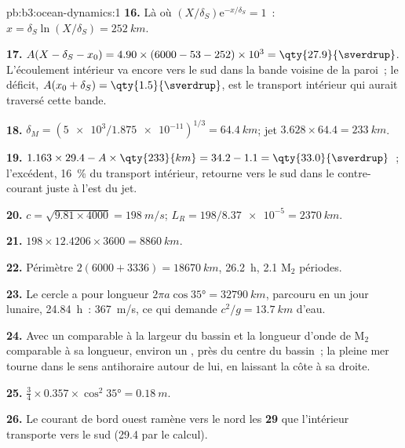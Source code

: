 \begin{solution}{pb:b3:ocean-dynamics:1}
\textbf{16.} Là où $(X/\delta_S)\mathrm e^{-x/\delta_S} = 1$~: $x =
\delta_S\ln(X/\delta_S) = \qty{252}{km}$.

\textbf{17.} $A(X - \delta_S - x_0) = 4.90\times(6000 - 53 - 252)\times
10^3 = \qty{27.9}{\sverdrup}$. L'écoulement intérieur va encore vers le sud dans
la bande voisine de la paroi~; le déficit, $A(x_0 + \delta_S) =
\qty{1.5}{\sverdrup}$, est le transport intérieur qui aurait traversé
cette bande.

\textbf{18.} $\delta_M = (\num{5e3}/\num{1.875e-11})^{1/3} = \qty{64.4}{km}$;
jet $3.628\times64.4 = \qty{233}{km}$.

\textbf{19.} $1.163\times29.4 - A\times\qty{233}{km} = 34.2 - 1.1 =
\qty{33.0}{\sverdrup}$~; l'excédent, \qty{16}{\percent} du transport
intérieur, retourne vers le sud dans le contre-courant juste à l'est du jet.

\textbf{20.} $c = \sqrt{9.81\times4000} = \qty{198}{m/s}$; $L_R =
198/\num{8.37e-5} = \qty{2370}{km}$.

\textbf{21.} $198\times12.4206\times3600 = \qty{8860}{km}$.

\textbf{22.} Périmètre $2(6000 + 3336) = \qty{18670}{km}$, \qty{26.2}{h},
2.1 M$_2$ périodes.

\textbf{23.} Le cercle a pour longueur $2\pi a\cos\ang{35} = \qty{32790}{km}$, parcouru
en un jour lunaire, \qty{24.84}{h}~: \qty{367}{m/s}, ce qui demande $c^2/g =
\qty{13.7}{km}$ d'eau.

\textbf{24.} Avec un  comparable à la largeur du bassin
et la longueur d'onde de M$_2$ comparable à sa longueur, environ un
, près du centre du bassin~; la pleine mer tourne dans le sens antihoraire
autour de lui, en laissant la côte à sa droite.

\textbf{25.} $\tfrac34\times0.357\times\cos^2\ang{35} = \qty{0.18}{m}$.

\textbf{26.} Le courant de bord ouest ramène vers le nord les
\textbf{\qty[text-series-to-math=true]{29}{\sverdrup}} que l'intérieur
transporte vers le sud (\qty{29.4}{\sverdrup} par le calcul).
\end{solution}

